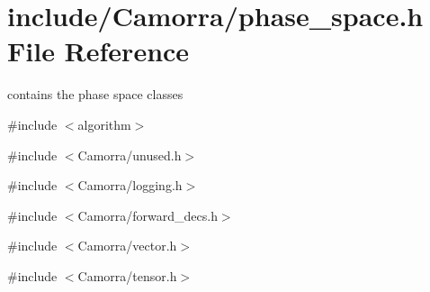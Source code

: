 \hypertarget{a00715}{
\section{include/Camorra/phase\_\-space.h File Reference}
\label{a00715}
}


contains the phase space classes  


{\ttfamily \#include $<$algorithm$>$}\par
{\ttfamily \#include $<$Camorra/unused.h$>$}\par
{\ttfamily \#include $<$Camorra/logging.h$>$}\par
{\ttfamily \#include $<$Camorra/forward\_\-decs.h$>$}\par
{\ttfamily \#include $<$Camorra/vector.h$>$}\par
{\ttfamily \#include $<$Camorra/tensor.h$>$}\par
